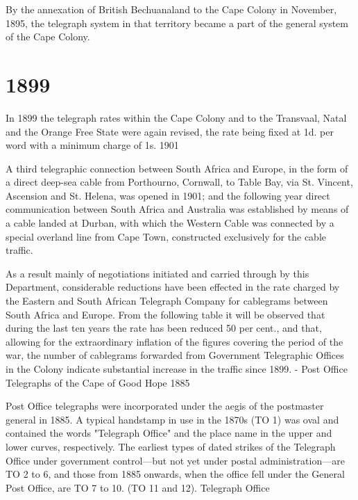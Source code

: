 By the annexation of British Bechuanaland to the Cape Colony in November, 1895, 
the telegraph system in that territory became a part of the 
general system of the Cape Colony.

\chapter{1899
} 
In 1899 the telegraph rates within the Cape Colony and to the Transvaal, 
Natal and the Orange Free State were
again revised, the rate being fixed at 1d. per word with a minimum charge of 1s.
1901







A third telegraphic connection between South Africa and Europe, in the form of a 
direct deep-sea cable from Porthourno, Cornwall, to Table Bay, via St. Vincent, 
Ascension and St. Helena, was opened in 1901; and the following year direct 
communication 
between South Africa and Australia was 
established by means of a cable landed at Durban, with which the 
Western Cable was 
connected by a special overland line from Cape Town, constructed 
exclusively for the cable traffic.


As a result mainly of negotiations initiated and carried through by this 
Department, considerable reductions
have been effected in the rate charged by the Eastern and South African 
Telegraph Company for cablegrams between South Africa and Europe. 
From the following table it will be observed that during the last 
ten years the rate has been reduced 50 per cent., and that, allowing 
for the extraordinary inflation of the figures covering the period of 
the war, the number of cablegrams forwarded from Government Telegraphic 
Offices in the Colony indicate substantial increase in the traffic since 1899. -
Post Office Telegraphs of the Cape of Good Hope 1885



Post Office telegraphs were incorporated under the aegis of the 
postmaster general in 1885. A typical handstamp in use in the 1870s (TO 1) 
was oval and contained the words "Telegraph Office" and the place name in 
the upper and lower curves, respectively. The earliest types of dated strikes 
of the Telegraph Office under government control---but not yet under 
postal administration---are TO 2 to 6, and those from 1885 onwards, 
when the office fell under the General Post Office, are TO 7 to 10. (TO 11 and 12).
Telegraph Office
 

